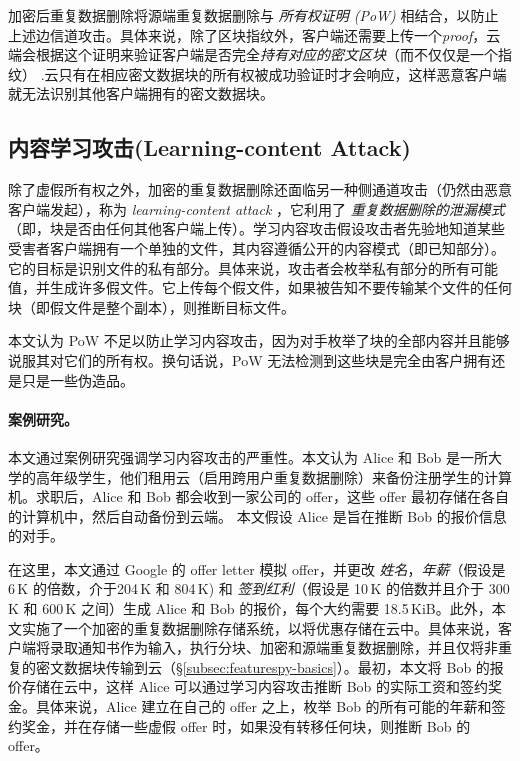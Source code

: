 加密后重复数据删除将源端重复数据删除与 {\em 所有权证明 (PoW)} \cite{halevi11} 相结合，以防止上述边信道攻击。具体来说，除了区块指纹外，客户端还需要上传一个{\em proof}，云端会根据这个证明来验证客户端是否完全{\em 持有对应的密文区块}（而不仅仅是一个指纹） .云只有在相应密文数据块的所有权被成功验证时才会响应，这样恶意客户端就无法识别其他客户端拥有的密文数据块。

\subsection{内容学习攻击(Learning-content Attack)}
\label{subsec:featurespy-attack}
除了虚假所有权之外，加密的重复数据删除还面临另一种侧通道攻击（仍然由恶意客户端发起），称为 {\em learning-content attack} \cite{harnik10, zuo2018mitigating}，它利用了 {\em 重复数据删除的泄漏模式}（即，块是否由任何其他客户端上传）。学习内容攻击假设攻击者先验地知道某些受害者客户端拥有一个单独的文件，其内容遵循公开的内容模式（即已知部分）。它的目标是识别文件的私有部分。具体来说，攻击者会枚举私有部分的所有可能值，并生成许多假文件。它上传每个假文件，如果被告知不要传输某个文件的任何块（即假文件是整个副本），则推断目标文件。

本文认为 PoW \cite{halevi11} 不足以防止学习内容攻击，因为对手枚举了块的全部内容并且能够说服其对它们的所有权。换句话说，PoW 无法检测到这些块是完全由客户拥有还是只是一些伪造品。

\paragraph*{案例研究。}
本文通过案例研究强调学习内容攻击的严重性。本文认为 Alice 和 Bob 是一所大学的高年级学生，他们租用云（启用跨用户重复数据删除）来备份注册学生的计算机。求职后，Alice 和 Bob 都会收到一家公司的 offer，这些 offer 最初存储在各自的计算机中，然后自动备份到云端。
本文假设 Alice 是旨在推断 Bob 的报价信息的对手。


在这里，本文通过 Google 的 offer letter \cite{GoogleOffer} 模拟 offer，并更改 \textit{姓名}，\textit{年薪}（假设是 6\,K \cite{harnik10} 的倍数，介于204\,K 和 804\,K) 和 \textit{签到红利}（假设是 10\,K 的倍数并且介于 300\,K 和 600\,K 之间）生成 Alice 和 Bob 的报价，每个大约需要 18.5\,KiB。此外，本文实施了一个加密的重复数据删除存储系统，以将优惠存储在云中。具体来说，客户端将录取通知书作为输入，执行分块、加密和源端重复数据删除，并且仅将非重复的密文数据块传输到云（\S\ref{subsec:featurespy-basics}）。最初，本文将 Bob 的报价存储在云中，这样 Alice 可以通过学习内容攻击推断 Bob 的实际工资和签约奖金。具体来说，Alice 建立在自己的 offer 之上，枚举 Bob 的所有可能的年薪和签约奖金，并在存储一些虚假 offer 时，如果没有转移任何块，则推断 Bob 的 offer。


